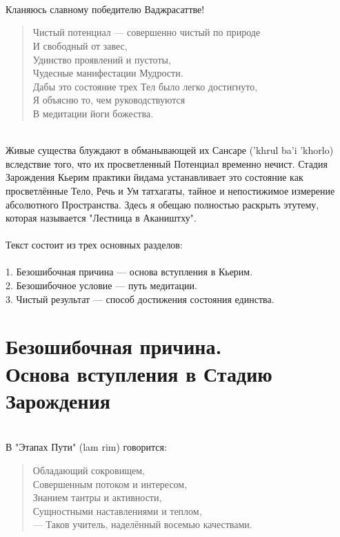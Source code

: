 \section*{}
\\
Кланяюсь славному победителю Ваджрасаттве!

\begin{verse}
Чистый потенциал — совершенно чистый по природе\\
И свобод\-ный от завес,\\
Удинство проявлений и пустоты,\\
Чудесные мани\-фестации Мудрости.\\
Дабы это состояние трех Тел было легко достигнуто,\\
Я объясню то, чем руководствуются\\
В медитации йоги божества.\\
\end{verse}
\\
Живые существа блуждают в обманывающей их Сансаре ('khrul ba'i 'khorlo)
вследствие того, что их просветленный Потенциал временно нечист.
Стадия Зарождения Кьерим практики йидама устанавливает это
состояние как просветлённые Тело, Речь и Ум татхагаты, тайное
и непостижимое измерение абсолютного Пространства. Здесь я
обещаю полностью раскрыть этутему, которая называется
"Лестница в Акаништху".\\
\\
Текст состоит из трех основных разделов:\\
\\
1. Безошибочная причина — основа вступления в Кьерим.\\
2. Безошибочное условие — путь медитации.\\
3. Чистый результат — способ достижения состояния единства.\\
\newpage
\section{Безошибочная причина.\\Основа вступления в Стадию Зарождения}

\\
В "Этапах Пути" (lam rim) говорится:

\begin{verse}
Обладающий сокровищем,\\
Совершенным потоком и интересом,\\
Знанием тантры и активности,\\
Сущностными наставлениями и теплом,\\
— Таков учитель, наделённый восемью качествами.
\end{verse}

